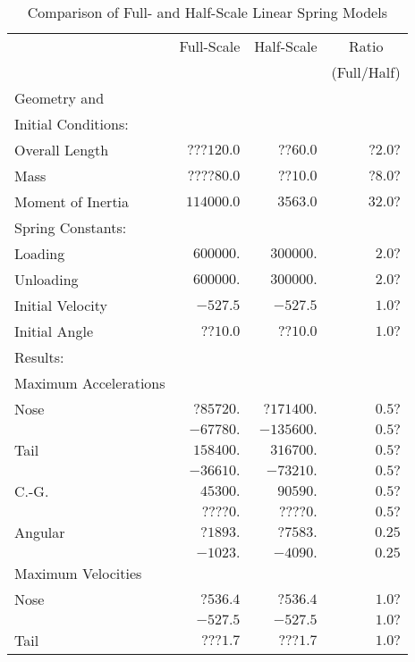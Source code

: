 \begin{table}
\begin{center}
\caption{Comparison of Full- and Half-Scale Linear Spring Models}
\makeqnum
\begin{tabular}{||l|r|r|r||}
\hline
 &\multicolumn{1}{|c}{Full-Scale}
 &\multicolumn{1}{|c}{Half-Scale}
 &\multicolumn{1}{|c||}{Ratio}\\
 & & &\multicolumn{1}{|c||}{(Full/Half)}\\
Geometry and & & & \\
Initial Conditions: & & & \\
\quad Overall Length     &$???120.0$ &$??60.0$ &$?2.0?$\\
\quad Mass               &$????80.0$ &$??10.0$ &$?8.0?$\\
\quad Moment of Inertia  &$114000.0$ &$3563.0$ &$32.0?$\\
\quad Spring Constants: & & &\\
\quad \quad Loading             &$600000.$ &$300000.$ &$2.0?$\\
\quad \quad Unloading           &$600000.$ &$300000.$ &$2.0?$\\
\quad Initial Velocity  &$-527.5$ &$-527.5$ &$1.0?$\\
\quad Initial Angle     &$??10.0$ &$??10.0$ &$1.0?$\\
\hline
Results: & & & \\
Maximum Accelerations & & & \\
\quad    Nose            &$?85720.$ &$?171400.$ &$0.5?$\\
                    &$-67780.$ &$-135600.$ &$0.5?$\\
\quad    Tail            &$158400.$ &$316700.$ &$0.5?$\\
                    &$-36610.$ &$-73210.$ &$0.5?$\\
\quad    C.-G.            &$45300.$ &$90590.$ &$0.5?$\\
                     &$????0.$ &$????0.$ &$0.5?$\\
\quad    Angular          &$?1893.$ &$?7583.$ &$0.25$\\
                     &$-1023.$ &$-4090.$ &$0.25$\\
Maximum Velocities & & & \\
\quad    Nose              &$?536.4$ &$?536.4$ &$1.0?$\\
                      &$-527.5$ &$-527.5$ &$1.0?$\\
\quad    Tail          &$???1.7$ &$???1.7$ &$1.0?$\\

\end{tabular}
\end{center}
\end{table}
